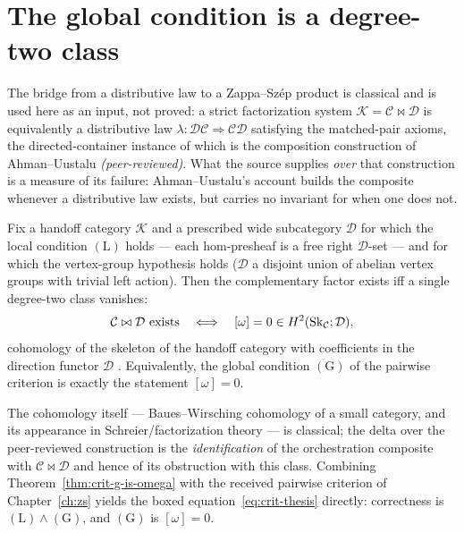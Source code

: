 \section{The global condition is a degree-two class}
\label{sec:crit-identification}

The bridge from a distributive law to a Zappa--Sz\'ep product is classical and is
used here as an input, not proved: a strict factorization system
$\mathcal{K}=\mathcal{C}\bowtie\mathcal{D}$ is equivalently a distributive law
$\lambda:\mathcal{D}\mathcal{C}\Rightarrow\mathcal{C}\mathcal{D}$ satisfying the
matched-pair axioms, the directed-container instance of which is the composition
construction of Ahman--Uustalu \emph{(peer-reviewed)}. What the source supplies
\emph{over} that construction is a measure of its failure: Ahman--Uustalu's account
builds the composite whenever a distributive law exists, but carries no invariant
for when one does not.

\begin{theorem}
\label{thm:crit-g-is-omega}
Fix a handoff category $\mathcal{K}$ and a prescribed wide subcategory
$\mathcal{D}$ for which the local condition $(\mathrm{L})$ holds --- each
hom-presheaf is a free right $\mathcal D$-set --- and for which the vertex-group
hypothesis holds ($\mathcal D$ a disjoint union of abelian vertex groups with trivial
left action). Then the complementary factor exists iff a single degree-two class
vanishes:
\[
  \mathcal{C}\bowtie\mathcal{D}\ \text{exists}
  \quad\Longleftrightarrow\quad
  [\omega]=0\in \Hcoh(\mathrm{Sk}_{\mathcal{C}};\mathcal D),
\]
cohomology of the skeleton of the handoff category with coefficients in the
direction functor $\mathcal D$ \cite{cl-emergent,cl-h2edges}. Equivalently, the global
condition $(\mathrm{G})$ of the pairwise criterion is exactly the statement
$[\omega]=0$.
\end{theorem}

The cohomology itself --- Baues--Wirsching cohomology of a small category, and its
appearance in Schreier/factorization theory --- is classical; the delta over the
peer-reviewed construction is the \emph{identification} of the orchestration
composite with $\mathcal{C}\bowtie\mathcal{D}$ and hence of its obstruction with
this class. Combining Theorem~\ref{thm:crit-g-is-omega} with the received pairwise
criterion of Chapter~\ref{ch:zs} yields the boxed equation~\eqref{eq:crit-thesis}
directly: correctness is $(\mathrm{L})\wedge(\mathrm{G})$, and $(\mathrm{G})$ is
$[\omega]=0$.


